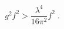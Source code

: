 \begin{equation}
\label{eq:ineqlambda}
g^2 f^2 > \frac{\lambda^4}{16 \pi^2} f^2 \;.  
\end{equation} 
